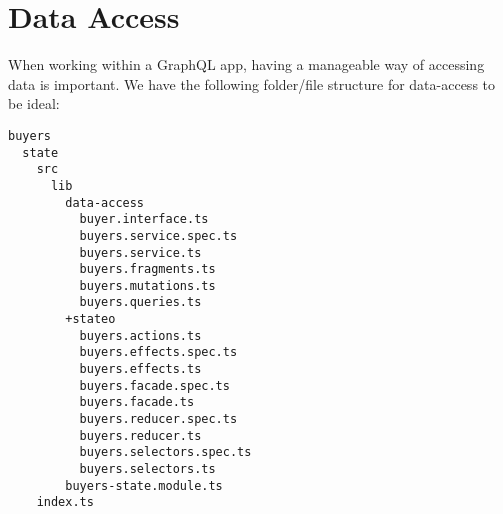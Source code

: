 \maketitle{}
\section{ Data Access }
When working within a GraphQL app, having a manageable way of accessing data
is important. We have the following folder/file structure for data-access to
be ideal:
\begin{verbatim}
buyers
  state
    src
      lib
        data-access
          buyer.interface.ts
          buyers.service.spec.ts
          buyers.service.ts
          buyers.fragments.ts
          buyers.mutations.ts
          buyers.queries.ts
        +stateo
          buyers.actions.ts
          buyers.effects.spec.ts
          buyers.effects.ts
          buyers.facade.spec.ts
          buyers.facade.ts
          buyers.reducer.spec.ts
          buyers.reducer.ts
          buyers.selectors.spec.ts
          buyers.selectors.ts
        buyers-state.module.ts
    index.ts
\end{verbatim}
